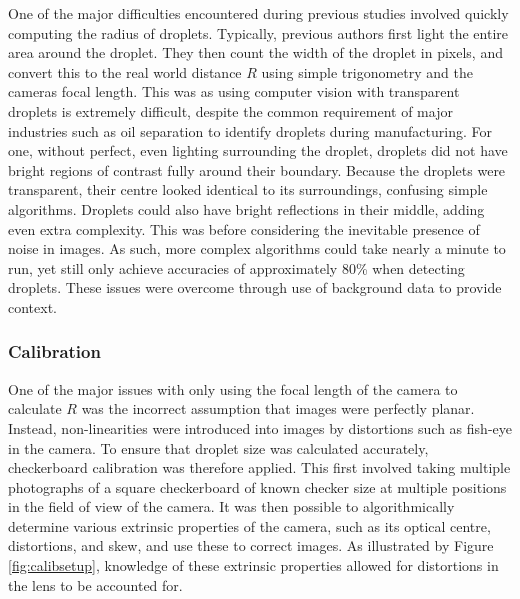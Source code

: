 \documentclass{physics_article_B}
\begin{document}
        One of the major difficulties encountered during previous studies involved quickly computing the radius of droplets. Typically, previous authors first light the entire area around the droplet. They then count the width of the droplet in pixels, and convert this to the real world distance $R$ using simple trigonometry and the cameras focal length. This was as using computer vision with transparent droplets is extremely difficult, despite the common requirement of major industries such as oil separation to identify droplets during manufacturing\cite{bubblegeneral}. For one, without perfect, even lighting surrounding the droplet, droplets did not have bright regions of contrast fully around their boundary. Because the droplets were transparent, their centre looked identical to its surroundings, confusing simple algorithms\cite{bubblegeneral}. Droplets could also have bright reflections in their middle, adding even extra complexity. This was before considering the inevitable presence of noise in images. As such, more complex algorithms could take nearly a minute to run, yet still only achieve accuracies of approximately 80\%\cite{bubble2} when detecting droplets. These issues were overcome through use of background data to provide context.

        \subsubsection{Calibration\label{sect:method:vision:calib}}

            One of the major issues with only using the focal length of the camera to calculate $R$ was the incorrect assumption that images were perfectly planar. Instead, non-linearities were introduced into images by distortions such as fish-eye in the camera. To ensure that droplet size was calculated accurately, checkerboard calibration was therefore applied. This first involved taking multiple photographs of a square checkerboard of known checker size at multiple positions in the field of view of the camera. It was then possible to algorithmically determine various extrinsic properties of the camera, such as its optical centre, distortions, and skew\cite{CameraCalibration}, and use these to correct images. As illustrated by Figure \ref{fig:calibsetup}, knowledge of these extrinsic properties allowed for distortions in the lens to be accounted for. 
            
\end{document}
